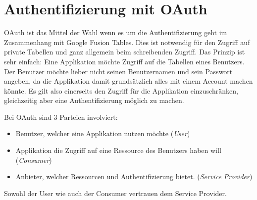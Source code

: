 \section{Authentifizierung mit OAuth}
\label{oauth}

\gls{OAuth} ist das Mittel der Wahl wenn es um die Authentifizierung geht im Zusammenhang mit Google Fusion Tables. Dies ist notwendig für den Zugriff auf private Tabellen und ganz allgemein beim schreibenden Zugriff.
Das Prinzip ist sehr einfach: Eine Applikation möchte Zugriff auf die Tabellen eines Benutzers. Der Benutzer möchte lieber nicht seinen Benutzernamen und sein Passwort angeben, da die Applikation damit grundsätzlich alles mit einem Account machen könnte. Es gilt also einerseits den Zugriff für die Applikation einzuschränken, gleichzeitig aber eine Authentifizierung möglich zu machen.

Bei \gls{OAuth} sind 3 Parteien involviert:
\begin{itemize}
\item Benutzer, welcher eine Applikation nutzen möchte (\emph{User})
\item Applikation die Zugriff auf eine Ressource des Benutzers haben will (\emph{Consumer})
\item Anbieter, welcher Ressourcen und Authentifizierung bietet. (\emph{Service Provider})
\end{itemize}

Sowohl der User wie auch der Consumer vertrauen dem Service Provider.


